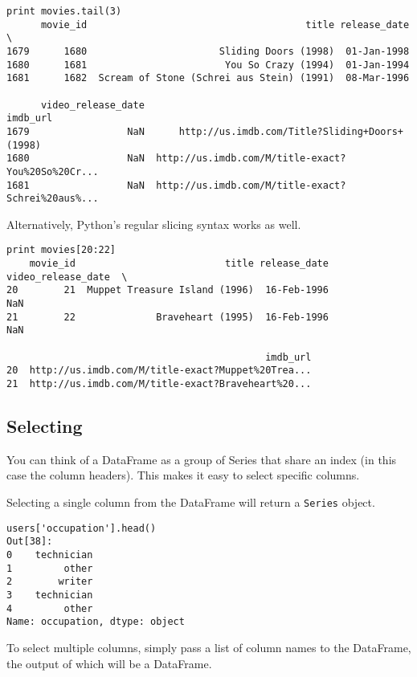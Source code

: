 \begin{framed}
\begin{framed}
\begin{framed}
\begin{framed}
\begin{verbatim}
print movies.tail(3)
      movie_id                                      title release_date  \
1679      1680                       Sliding Doors (1998)  01-Jan-1998   
1680      1681                        You So Crazy (1994)  01-Jan-1994   
1681      1682  Scream of Stone (Schrei aus Stein) (1991)  08-Mar-1996   

      video_release_date                                           imdb_url  
1679                 NaN      http://us.imdb.com/Title?Sliding+Doors+(1998)  
1680                 NaN  http://us.imdb.com/M/title-exact?You%20So%20Cr...  
1681                 NaN  http://us.imdb.com/M/title-exact?Schrei%20aus%...  
\end{verbatim}

Alternatively, Python's regular slicing syntax works as well.

\begin{verbatim}
print movies[20:22]
    movie_id                          title release_date  video_release_date  \
20        21  Muppet Treasure Island (1996)  16-Feb-1996                 NaN   
21        22              Braveheart (1995)  16-Feb-1996                 NaN   

                                             imdb_url  
20  http://us.imdb.com/M/title-exact?Muppet%20Trea...  
21  http://us.imdb.com/M/title-exact?Braveheart%20...  
\end{verbatim}


\subsection{Selecting}

You can think of a DataFrame as a group of Series that share an index (in this case the column headers). This makes it easy to select specific columns.

Selecting a single column from the DataFrame will return a \texttt{Series} object.

\begin{framed}
\begin{verbatim}
users['occupation'].head()
Out[38]:
0    technician
1         other
2        writer
3    technician
4         other
Name: occupation, dtype: object
\end{verbatim}


To select multiple columns, simply pass a list of column names to the DataFrame, the output of which will be a DataFrame.



\end{framed}
\end{framed}
\end{framed}
\end{framed}
\end{framed}
